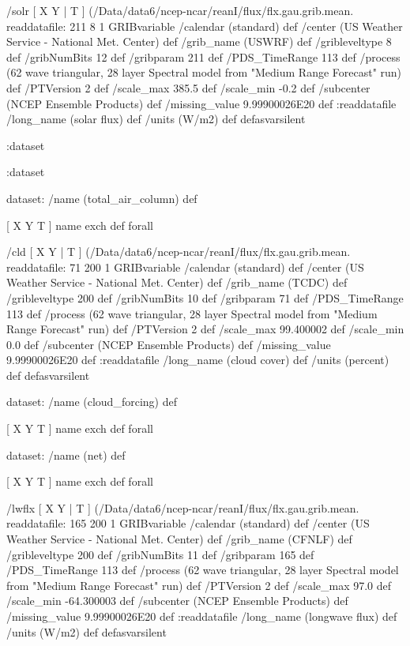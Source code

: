 \begin{ingrid}
   /solr { [ X Y | T ] (/Data/data6/ncep-ncar/reanI/flux/flx.gau.grib.mean.%
   readdatafile:
   211 8 1 GRIBvariable
   /calendar (standard) def
   /center (US Weather Service - National Met. Center) def
   /grib_name (USWRF) def
   /gribleveltype 8 def
   /gribNumBits 12 def
   /gribparam 211 def
   /PDS_TimeRange 113 def
   /process (62 wave triangular, 28 layer Spectral model from "Medium Range Forecast" run) def
   /PTVersion 2 def
   /scale_max 385.5 def
   /scale_min -0.2 def
   /subcenter (NCEP Ensemble Products) def
   /missing_value 9.99900026E20 def
   :readdatafile
   /long_name (solar flux) def
   /units (W/m2) def
   } defasvarsilent

  :dataset


 :dataset

 dataset: /name (total_air_column) def

  [ X Y T ] { name exch def } forall

  /cld { [ X Y | T ] (/Data/data6/ncep-ncar/reanI/flux/flx.gau.grib.mean.%
  readdatafile:
  71 200 1 GRIBvariable
  /calendar (standard) def
  /center (US Weather Service - National Met. Center) def
  /grib_name (TCDC) def
  /gribleveltype 200 def
  /gribNumBits 10 def
  /gribparam 71 def
  /PDS_TimeRange 113 def
  /process (62 wave triangular, 28 layer Spectral model from "Medium Range Forecast" run) def
  /PTVersion 2 def
  /scale_max 99.400002 def
  /scale_min 0.0 def
  /subcenter (NCEP Ensemble Products) def
  /missing_value 9.99900026E20 def
  :readdatafile
  /long_name (cloud cover) def
  /units (percent) def
  } defasvarsilent

  dataset: /name (cloud_forcing) def

   [ X Y T ] { name exch def } forall

   dataset: /name (net) def

    [ X Y T ] { name exch def } forall

    /lwflx { [ X Y | T ] (/Data/data6/ncep-ncar/reanI/flux/flx.gau.grib.mean.%
    readdatafile:
    165 200 1 GRIBvariable
    /calendar (standard) def
    /center (US Weather Service - National Met. Center) def
    /grib_name (CFNLF) def
    /gribleveltype 200 def
    /gribNumBits 11 def
    /gribparam 165 def
    /PDS_TimeRange 113 def
    /process (62 wave triangular, 28 layer Spectral model from "Medium Range Forecast" run) def
    /PTVersion 2 def
    /scale_max 97.0 def
    /scale_min -64.300003 def
    /subcenter (NCEP Ensemble Products) def
    /missing_value 9.99900026E20 def
    :readdatafile
    /long_name (longwave flux) def
    /units (W/m2) def
    } defasvarsilent


\end{ingrid}
